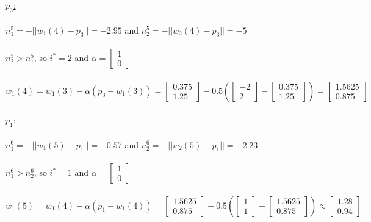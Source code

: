 \documentclass{article}
\begin{document}
\\\\\underline{$p_3$:} \\\\$n_1^5 = -||w_1(4)-p_3|| = -2.95$ and $n_2^5 = -||w_2(4)-p_3|| = -5$ \\\\
$n_2^5 > n_1^5$, so $i^{*} = 2$ and $\alpha = \begin{bmatrix}
  1\\ 
  0
\end{bmatrix}$ \\\\ $w_1(4)=w_1(3) - \alpha(p_3-w_1(3)) = \begin{bmatrix}
  0.375 \\
  1.25
\end{bmatrix} - 0.5 (\begin{bmatrix}
  -2\\
  2
\end{bmatrix} - \begin{bmatrix}
  0.375\\
  1.25
\end{bmatrix}) =  \begin{bmatrix}
  1.5625\\
  0.875
\end{bmatrix}$
\\\\ \underline{$p_1$:} \\\\$n_1^6 = -||w_1(5)-p_1|| = -0.57$ and $n_2^6 = -||w_2(5)-p_1|| = -2.23$ \\\\
$n_1^6 > n_2^6$, so $i^{*} = 1$ and $\alpha = \begin{bmatrix}
  1\\ 
  0
\end{bmatrix}$ \\\\ $w_1(5)=w_1(4) - \alpha(p_1-w_1(4)) = \begin{bmatrix}
  1.5625 \\
  0.875
\end{bmatrix} - 0.5 (\begin{bmatrix}
  1\\
  1
\end{bmatrix} - \begin{bmatrix}
  1.5625 \\
  0.875
\end{bmatrix}) \approx  \begin{bmatrix}
  1.28\\
  0.94
\end{bmatrix}$
\end{document}
